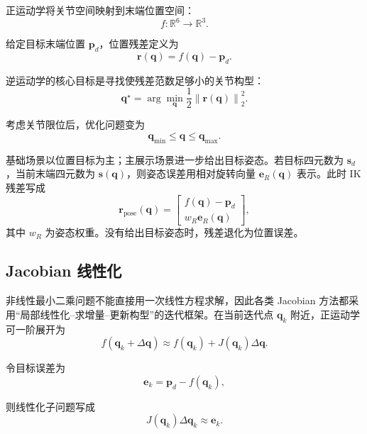 \documentclass[UTF8,zihao=-4]{ctexart}
\newcommand{\norm}[1]{\left\lVert #1 \right\rVert}
\begin{document}
正运动学将关节空间映射到末端位置空间：
\begin{equation}
  f:\mathbb{R}^{6}\rightarrow\mathbb{R}^{3}.
  \label{eq:fk-map}
\end{equation}

给定目标末端位置 $\bm p_d$，位置残差定义为
\begin{equation}
  \bm r(\bm q)=f(\bm q)-\bm p_d .
  \label{eq:ik-residual}
\end{equation}

逆运动学的核心目标是寻找使残差范数足够小的关节构型：
\begin{equation}
  \bm q^\star=\arg\min_{\bm q}\frac{1}{2}\norm{\bm r(\bm q)}_2^2 .
  \label{eq:ik-objective}
\end{equation}

考虑关节限位后，优化问题变为
\begin{equation}
  \bm q_{\min}\leq \bm q\leq \bm q_{\max}.
  \label{eq:joint-limit}
\end{equation}

基础场景以位置目标为主；主展示场景进一步给出目标姿态。若目标四元数为 $\bm s_d$，当前末端四元数为 $\bm s(\bm q)$，则姿态误差用相对旋转向量 $\bm e_R(\bm q)$ 表示。此时 IK 残差写成
\begin{equation}
  \bm r_{\mathrm{pose}}(\bm q)=
  \begin{bmatrix}
    f(\bm q)-\bm p_d\\
    w_R\bm e_R(\bm q)
  \end{bmatrix},
  \label{eq:pose-residual}
\end{equation}
其中 $w_R$ 为姿态权重。没有给出目标姿态时，残差退化为位置误差。

\subsection{Jacobian 线性化}
非线性最小二乘问题不能直接用一次线性方程求解，因此各类 Jacobian 方法都采用“局部线性化--求增量--更新构型”的迭代框架。在当前迭代点 $\bm q_k$ 附近，正运动学可一阶展开为
\begin{equation}
  f(\bm q_k+\Delta\bm q)
  \approx
  f(\bm q_k)+J(\bm q_k)\Delta\bm q .
  \label{eq:linearization}
\end{equation}

令目标误差为
\begin{equation}
  \bm e_k=\bm p_d-f(\bm q_k),
  \label{eq:error-vector}
\end{equation}

则线性化子问题写成
\begin{equation}
  J(\bm q_k)\Delta\bm q_k\approx \bm e_k .
  \label{eq:linear-system}
\end{equation}
\end{document}
